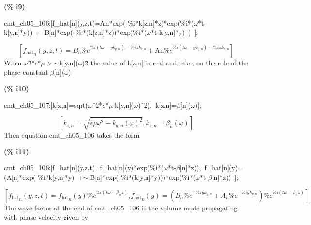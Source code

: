 \documentclass[fleqn]{article}
\begin{document}
\noindent
\begin{minipage}[t]{4.000000em}\color{red}\bfseries
(\% i9)	
\end{minipage}
\begin{minipage}[t]{\textwidth}\color{blue}
cmt\_ch05\_106:[f\_hat[n](y,z,t)=An*exp(-\%i*k[z,n]*z)*exp(\%i*(\ensuremath{\omega}*t-k[y,n]*y))\ +\ B[n]*exp(-\%i*(k[z,n]*z))*exp(\%i*(\ensuremath{\omega}*t-k[y,n]*y)\ )\ ];
\end{minipage}
\[\displaystyle \tag{\% o9} 
\left[ {{{f_{\ensuremath{\mathrm{hat}}}}}_n}\left( y\operatorname{,}z\operatorname{,}t\right) ={B_n} {{\% e}^{\% i \left( t \omega -y {k_{y,n}}\right) -\% i z {k_{z,n}}}}+\ensuremath{\mathrm{An}} {{\% e}^{\% i \left( t \omega -y {k_{y,n}}\right) -\% i z {k_{z,n}}}}\right] \mbox{}
\]
When \ensuremath{\omega}\^ 2*\ensuremath{\epsilon}*\ensuremath{\mu}\ensuremath{>}\ensuremath{\sim }k[y,n](\ensuremath{\omega})\^ 2 the value of k[z,n] is real and takes on the role of the phase constant \ensuremath{\beta}[n](\ensuremath{\omega})


\noindent
\begin{minipage}[t]{4.000000em}\color{red}\bfseries
(\% i10)	
\end{minipage}
\begin{minipage}[t]{\textwidth}\color{blue}
cmt\_ch05\_107:[k[z,n]=sqrt(\ensuremath{\omega}\^\ 2*\ensuremath{\epsilon}*\ensuremath{\mu}-k[y,n](\ensuremath{\omega})\^\ 2),\ k[z,n]=\ensuremath{\beta}[n](\ensuremath{\omega})];
\end{minipage}
\[\displaystyle \tag{\% o10} 
\left[ {k_{z,n}}=\sqrt{\epsilon  \mu  {{\omega }^{2}}-{{{k_{y,n}}\left( \omega \right) }^{2}}}\operatorname{,}{k_{z,n}}={{\beta }_n}\left( \omega \right) \right] \mbox{}
\]
Then equation cmt\_ch05\_106 takes the form


\noindent
\begin{minipage}[t]{4.000000em}\color{red}\bfseries
(\% i11)	
\end{minipage}
\begin{minipage}[t]{\textwidth}\color{blue}
cmt\_ch05\_106:[f\_hat[n](y,z,t)=f\_hat[n](y)*exp(\%i*(\ensuremath{\omega}*t-\ensuremath{\beta}[n]*z)),\ f\_hat[n](y)=(A[n]*exp(-\%i*k[y,n]*y)\ +\ensuremath{\sim\ }B[n]*exp(-\%i*(k[y,n]*y)))*exp(\%i*(\ensuremath{\omega}*t-\ensuremath{\beta}[n]*z))\ ];
\end{minipage}
\[\displaystyle \tag{\% o11} 
\left[ {{{f_{\ensuremath{\mathrm{hat}}}}}_n}\left( y\operatorname{,}z\operatorname{,}t\right) ={{{f_{\ensuremath{\mathrm{hat}}}}}_n}(y) {{\% e}^{\% i \left( t \omega -{{\beta }_n} z\right) }}\operatorname{,}{{{f_{\ensuremath{\mathrm{hat}}}}}_n}(y)=\left( {B_n} {{\% e}^{-\% i y {k_{y,n}}}}+{A_n} {{\% e}^{-\% i y {k_{y,n}}}}\right)  {{\% e}^{\% i \left( t \omega -{{\beta }_n} z\right) }}\right] \mbox{}
\]
The wave factor at the end of cmt\_ch05\_106 is the volume mode propagating with phase velocity given by
\end{document}
